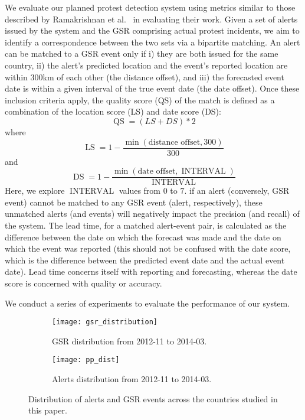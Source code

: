 We evaluate our planned protest detection system
using metrics similar to those described by Ramakrishnan et al.~\cite{emberskdd} in evaluating their work.
Given a set of alerts issued by the system and the GSR comprising actual protest incidents, we aim to identify
a correspondence between the two sets via a bipartite matching.
An alert can be matched to a GSR event only if i) they are both issued for the same country, 
ii) the alert's predicted location and the event's reported location are within 300km of each
other (the distance offset), and iii) the forecasted event date is within a given interval of the true event date (the date offset).
Once these inclusion criteria apply, the quality score (QS) of the match is defined as a combination of the
location score (LS) and date score (DS):
\begin{equation}
    \operatorname{QS}= (LS + DS)*2
\end{equation}
\noindent
where
\begin{equation}
    \operatorname{LS}=1 - \frac{\min(\textrm{distance offset}, 300)}{300}
\end{equation}
and 
\begin{equation}
    \operatorname{DS}=1 - \frac{\min(\textrm{date offset}, \operatorname{INTERVAL})}{\operatorname{INTERVAL}}
\end{equation}
Here, we explore $\operatorname{INTERVAL}$ values from $0$ to $7$.
if an alert (conversely, GSR event) cannot be matched to any GSR event (alert, respectively), these unmatched
alerts (and events) will negatively impact the precision (and recall) of the system. The lead time,
for a matched alert-event pair,
is calculated as the difference between the date on which the forecast was made and the date on which the event
was reported (this should not be confused with the date score, which is the difference between the
predicted event date and the actual event date). Lead time concerns itself with reporting and forecasting, whereas
the date score is concerned with quality or accuracy.

We conduct a series of experiments to evaluate the performance of our system.\\

\begin{figure*}
\centering
\begin{subfigure}{\columnwidth}
  \centering
  \texttt{[image: gsr\_distribution]}
  \caption{GSR distribution from 2012-11 to 2014-03.}
  \label{fig:gsrdistribution}
\end{subfigure}%
\begin{subfigure}{\columnwidth}
  \centering
  \texttt{[image: pp\_dist]}
  \caption{Alerts distribution from 2012-11 to 2014-03.}
  \label{fig:ppdistribution}
\end{subfigure}
\caption{Distribution of alerts and GSR events across the countries studied in this paper.}
\label{fig:distribution}
\end{figure*}

